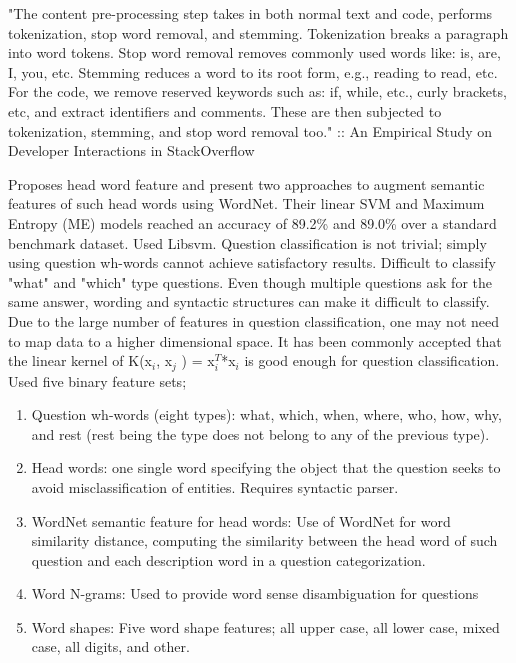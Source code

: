 "The content pre-processing step takes in both normal text and code, performs tokenization, stop word removal, and stemming. 
Tokenization breaks a paragraph into word tokens. 
Stop word removal removes commonly used words like: is, are, I, you, etc. 
Stemming reduces a word to its root form, e.g., reading to read, etc. 
For the code, we remove reserved keywords such as: if, while, etc., curly brackets, etc, and extract identifiers and comments. 
These are then subjected to tokenization, stemming, and stop word removal too."
\cite{Wang2013} :: An Empirical Study on Developer Interactions in StackOverflow

Proposes head word feature and present two approaches to augment semantic features of such head words using WordNet. 
Their linear SVM and Maximum Entropy (ME) models reached an accuracy of 89.2\% and 89.0\% over a standard benchmark dataset. 
Used Libsvm.
Question classification is not trivial; simply using question wh-words cannot achieve satisfactory results. 
Difficult to classify "what" and "which" type questions. 
Even though multiple questions ask for the same answer, wording and syntactic structures can make it difficult to classify.
Due to the large number of features in question classification, one may not need to map data to a higher dimensional space. 
It has been commonly accepted that the linear kernel of
K(x$_{i}$, x$_{j}$ ) = x$_{i}^{T}$*x$_{i}$
is good enough for question classification. \\
Used five binary feature sets; 
\begin{enumerate}
	\item Question wh-words (eight types): what, which, when, where, who, how, why, and rest (rest being the type does not belong to any of the previous type).
	\item Head words: one single word specifying the object that the question seeks to avoid misclassification of entities. Requires syntactic parser.
	\item WordNet semantic feature for head words: 
	Use of WordNet for word similarity distance, computing the similarity between the head word of such question and each description word in a question categorization.
	\item Word N-grams: Used to provide word sense disambiguation for questions
	\item Word shapes: Five word shape features; all upper case, all lower case, mixed case, all digits, and other.
\end{enumerate}
